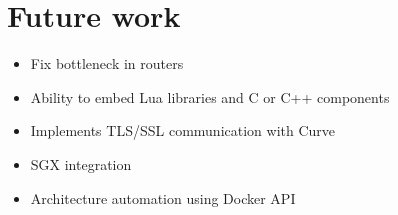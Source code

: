 \section{Future work}
\label{sec:future}


\begin{itemize}
  \item Fix bottleneck in routers
  \item Ability to embed Lua libraries and C or C++ components
  \item Implements TLS/SSL communication with Curve
  \item SGX integration
  \item Architecture automation using Docker API
\end{itemize}
